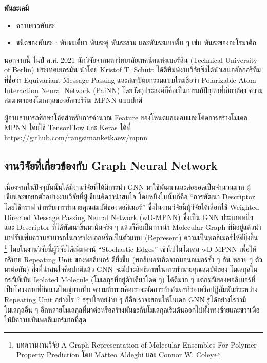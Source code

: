 \noindent \textbf{พันธะเคมี}
\begin{itemize}
    \item ความยาวพันธะ
    
    \item ชนิดของพันธะ : พันธะเดี่ยว พันธะคู่ พันธะสาม และพันธะแบบอื่น ๆ เช่น พันธะของอะโรมาติก
\end{itemize}

นอกจากนี้ ในปี ค.ศ. 2021 นักวิจัยจากมหาวิทยาลัยเทคนิคแห่งเบอร์ลิน (Technical University of Berlin) ประเทศเยอรมัน นำโดย 
Kristof T. Sch\"{u}tt ได้ตีพิมพ์งานวิจัยซึ่งได้นำเสนออัลกอริทึมที่ชื่อว่า Equivariant Message Passing และสถาปัตยกรรมแบบใหม่ชื่อว่า 
Polarizable Atom Interaction Neural Network (PaiNN)\autocite{schutt2021} โดยวัตถุประสงค์ก็คือเป็นการแก้ปัญหาที่เกี่ยวข้อง%
ความสมมาตรของโมเลกุลของอัลกอริทึม MPNN แบบปกติ

ผู้อ่านสามารถศึกษาโค้ดสำหรับการคำนวณ Feature ของโหนดและขอบและโค้ดการสร้างโมเดล MPNN โดยใช้ TensorFlow และ Keras ได้ที่
\url{https://github.com/rangsimanketkaew/mpnn}

\subsection{งานวิจัยที่เกี่ยวข้องกับ Graph Neural Network}
\label{ssec:gnn_papers}

เนื่องจากในปัจจุบันนั้นได้มีงานวิจัยที่ได้มีการนำ GNN มาใช้พัฒนาและต่อยอดเป็นจำนวนมาก ผู้เขียนจะขอยกตัวอย่างงานวิจัยที่ผู้เขียนคิดว่าน่าสนใจ 
โดยหนึ่งในนั้นก็คือ \enquote{การพัฒนา Descriptor โดยใช้กราฟ สำหรับการทำนายคุณสมบัติของพอลิเมอร์}\autocite{aldeghi2022} 
ซึ่งในงานวิจัยนี้ผู้วิจัยได้เลือกใช้ Weighted Directed Message Passing Neural Network (wD-MPNN) ซึ่งเป็น GNN ประเภทหนึ่ง และ 
Descriptor ที่ได้พัฒนาขึ้นมานั้นจริง ๆ แล้วก็คือเป็นการนำ Molecular Graph ที่มีอยู่แล้วนำมาปรับเพิ่มความสามารถในการบ่งบอกหรือเป็นตัวแทน 
(Represent) ความเป็นพอลิเมอร์ให้ดียิ่งขึ้น%
\footnote{บทความงานวิจัย A Graph Representation of Molecular Ensembles For Polymer Property Prediction โดย Matteo 
Aldeghi และ Connor W. Coley} 
โดยในงานวิจัยนี้ผู้วิจัยได้เพิ่มพจน์ \enquote{Stochastic Edges} เข้าไปในโมเดล wD-MPNN เพื่อให้อธิบาย Repeating Unit ของพอลิเมอร์%
ดียิ่งขึ้น (พอลิเมอร์เกิดจากมอนอเมอร์ซ้ำ ๆ กัน หลาย ๆ ตัวมาต่อกัน) สิ่งที่น่าสนใจคือปกติแล้ว GNN จะมีประสิทธิภาพในการทำนายคุณสมบัติของ%
โมเลกุลในกรณีที่เป็น Isolated Molecule (โมเลกุลที่อยู่ตัวเดียวโดด ๆ) ได้ดีมาก ๆ แต่กรณีของพอลิเมอร์ที่เป็นโครงข่ายที่มีขนาดใหญ่มากนั้น 
ความท้าทายคือเราจะจัดการกับอันตรกิริยาหรือปฏิสัมพันธ์ระหว่าง Repeating Unit อย่างไร ? สรุปโจทย์ง่าย ๆ ก็คือเราจะสอนให้โมเดล GNN 
รู้ได้อย่างไรว่ามีโมเลกุลอื่น ๆ อีกหลายโมเลกุลที่มาต่อหรือสร้างพันธะกับโมเลกุลเริ่มต้นออกไปทั้งทางซ้ายและขวาเพื่อให้มีความเป็นพอลิเมอร์มากที่สุด 

